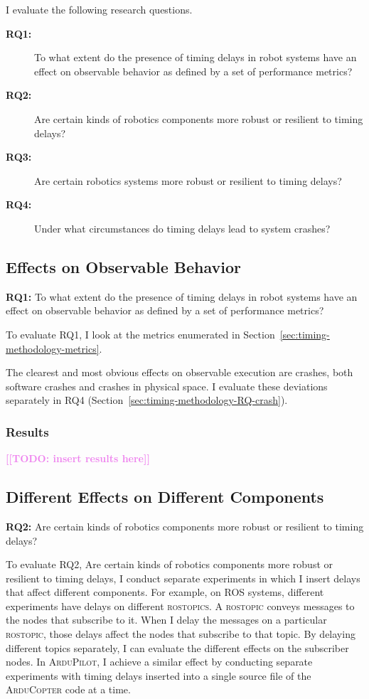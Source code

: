 \documentclass[conference]{IEEEtran}
\newcommand{\todo}[1]{\textcolor{violet}{{\bfseries [[TODO: #1]]}}}
\newcommand{\tool}[1]{\textsc{#1}}
\begin{document}
\label{sec:evaluation}
I evaluate the following research questions.
\begin{description}
\item[\textbf{RQ1:}] To what extent do the presence of timing delays in robot systems have an effect on observable behavior as defined by a set of performance metrics?
\item[\textbf{RQ2:}] Are certain kinds of robotics components more robust or resilient to timing delays?
\item[\textbf{RQ3:}]  Are certain robotics systems more robust or resilient to timing delays?
\item[\textbf{RQ4:}] Under what circumstances do timing delays lead to system crashes?
\end{description}

\subsection{Effects on Observable Behavior}
\label{sec:timing-methodology-RQ-observable}

\textbf{RQ1:} To what extent do the presence of timing delays in robot systems have an effect on observable behavior as defined by a set of performance metrics?

To evaluate RQ1, I look at the metrics enumerated in Section~\ref{sec:timing-methodology-metrics}.

The clearest and most obvious effects on observable execution are crashes, both software crashes and crashes in physical space.
I evaluate these deviations separately in RQ4 (Section~\ref{sec:timing-methodology-RQ-crash}).

\subsubsection{Results}
\todo{insert results here}

\subsection{Different Effects on Different Components}
\textbf{RQ2:} Are certain kinds of robotics components more robust or resilient to timing delays?

To evaluate RQ2, Are certain kinds of robotics components more robust or resilient to timing delays, 
I conduct separate experiments in which I insert delays that affect different 
components. 
For example, on \tool{ROS} systems, different experiments have delays on different 
\tool{rostopics}. 
A \tool{rostopic} conveys messages to the nodes that subscribe to it. 
When I delay the messages on a particular \tool{rostopic}, those delays affect the 
nodes that subscribe to that topic. 
By delaying different topics separately, I can evaluate the different effects on the subscriber nodes. 
In \tool{ArduPilot}, I achieve a similar effect by conducting separate experiments with timing delays inserted into a single source file of the \tool{ArduCopter} code at a time.
\end{document}
